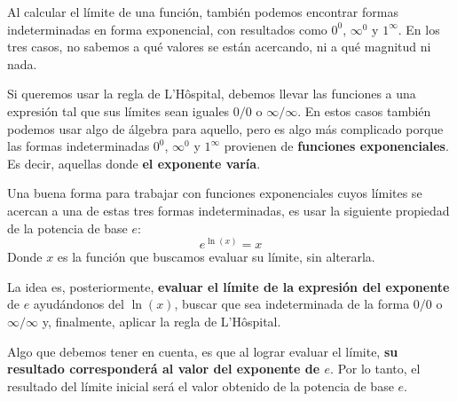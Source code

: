 \documentclass[12pt]{article}
\begin{document}
Al calcular el límite de una función, también podemos encontrar formas indeterminadas en forma exponencial, con resultados como $0^{0}$, $\infty^{0}$ y $1^{\infty}$. En los tres casos, no sabemos a qué valores se están acercando, ni a qué magnitud ni nada.

Si queremos usar la regla de L'Hôspital, debemos llevar las funciones a una expresión tal que sus límites sean iguales $0/0$ o $\infty/\infty$. En estos casos también podemos usar algo de álgebra para aquello, pero es algo más complicado porque las formas indeterminadas $0^{0}$, $\infty^{0}$ y $1^{\infty}$ provienen de \textbf{funciones exponenciales}. Es decir, aquellas donde \textbf{el exponente varía}.

Una buena forma para trabajar con funciones exponenciales cuyos límites se acercan a una de estas tres formas indeterminadas, es usar la siguiente propiedad de la potencia de base $e$:
\[
	e^{\ln(x)} = x
\]
Donde $x$ es la función que buscamos evaluar su límite, sin alterarla.

La idea es, posteriormente, \textbf{evaluar el límite de la expresión del exponente} de $e$ ayudándonos del $\ln(x)$, buscar que sea indeterminada de la forma $0/0$ o $\infty/\infty$ y, finalmente, aplicar la regla de L'Hôspital.

Algo que debemos tener en cuenta, es que al lograr evaluar el límite, \textbf{su resultado corresponderá al valor del exponente de $e$}. Por lo tanto, el resultado del límite inicial será el valor obtenido de la potencia de base $e$.

\newpage
\end{document}
